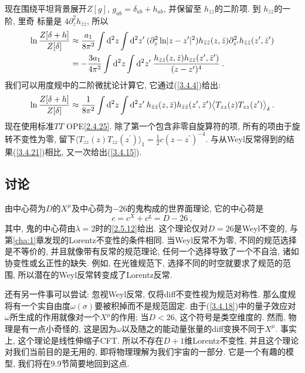 现在围绕平坦背景展开$Z[g]$, $g_{a b}=\delta_{a b}+h_{a b}$, 并保留至 $h_{\bar{z} \bar{z}} $的二阶项. 到 $h_{\bar{z} \bar{z}}$的一阶, 里奇 标量是 $4 \partial_{z}^{2} h_{\bar{z} \bar{z}}$, 所以
\begin{align}
\ln \frac{Z[\delta+h]}{Z[\delta]} & \approx \frac{a_{1}}{8 \pi^{2}} \int \mathrm{d}^{2} z \int \mathrm{d}^{2} z^{\prime} \:
(\partial_{z}^{2} \ln \lvert z-z^{\prime}\rvert^{2}) h_{\bar{z} \bar{z}}(z, \bar{z}) \partial_{z^{\prime}}^{2} h_{\bar{z} \bar{z}}(z^{\prime}, \bar{z}^{\prime}) \nonumber \\
&=-\frac{3 a_{1}}{4 \pi^{2}} \int \mathrm{d}^{2} z \int \mathrm{d}^{2} z^{\prime} \: \frac{h_{\bar{z} \bar{z}}(z, \bar{z}) h_{\bar{z} \bar{z}}(z^{\prime}, \bar{z}^{\prime})}{(z-z^{\prime})^{4}} \:. \label{3.4.21}
\end{align}
我们可以用度规中的二阶微扰论计算它, 它通过(\ref{3.4.4})给出: 
\begin{equation}
\ln \frac{Z[\delta+h]}{Z[\delta]} \approx \frac{1}{8 \pi^{2}} \int \mathrm{d}^{2} z \int \mathrm{d}^{2} z^{\prime} \: h_{\bar{z} \bar{z}}(z, \bar{z}) h_{\bar{z} \bar{z}}(z^{\prime}, \bar{z}^{\prime})\bigl\langle T_{z z}(z) T_{z z}(z^{\prime})\bigr\rangle_{\delta} \:. \label{3.4.22}
\end{equation}
现在使用标准$TT$ OPE\eqref{2.4.25}. 除了第一个包含非零自旋算符的项, 所有的项由于旋转不变性为零, 留下$\bigl\langle T_{z z}(z) T_{z z}(z^{\prime})\bigr\rangle_{1}=\frac{1}{2} c(z-z^{\prime})^{-4}$. 与从Weyl反常得到的结果(\ref{3.4.21})相比, 又一次给出(\ref{3.4.15}).

\subsection*{讨论}
由中心荷为$D$的$X^\mu$及中心荷为$-26$的鬼构成的世界面理论, 它的中心荷是
\begin{equation}
c=c^{X}+c^{\mathrm{g}}=D-26 \:, \label{3.4.23}
\end{equation}
其中, 鬼的中心荷由$\lambda=2$时的\eqref{2.5.12}给出. 这个理论仅对$D=26$是Weyl不变的, 与第\ref{cha:1}章发现的Lorentz不变性的条件相同. 当Weyl反常不为零, 不同的规范选择是不等价的, 并且就像带有反常的规范理论, 任何一个选择导致了一个不自洽, 诸如协变性或幺正性的缺失. 例如, 在光锥规范下, 选择不同的时空就要求了规范的范围, 所以潜在的Weyl反常转变成了Lorentz反常.

还有另一件事可以尝试: 忽视Weyl反常, 仅将diff不变性视为规范对称性. 那么度规将有一个实自由度$\omega(\sigma)$要被积掉而不是规范固定. 由于(\ref{3.4.18})中的量子效应对$\omega$所生成的作用就像对一个$X^\mu$的作用; 当$D<26$, 这个符号是类空维度的. 然而, 物理是有一点小奇怪的, 这是因为$\omega$以及随之的能动量张量的diff变换不同于$X^\mu$. 事实上, 这个理论是线性伸缩子CFT. 所以不存在$D{+}1$维Lorentz不变性, 并且这个理论对我们当前目的是无用的, 即将物理理解为我们宇宙的一部分. 它是一个有趣的模型, 我们将在9.9节简要地回到这点.

